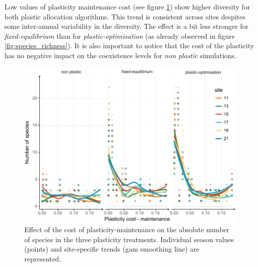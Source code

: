 

Low values of plasticity maintenance cost (see figure \ref{fig:pl_cost}) show higher diversity for both plastic allocation algorithms. This trend is consistent across sites despites some inter-annual variability in the diversity. The effect is a bit less stronger for \textit{fixed-equilibrium} than for \textit{plastic-optimisation} (as already observed in figure \ref{fig:species_richness}). It is also important to notice that the cost of the plasticity has no negative impact on the coexistence levels for \textit{non plastic} simulations.

\begin{figure}%
    \includegraphics[width=1\linewidth]{./2_PP/Figures/Comm/comm_n_sp_pc_m_edit.pdf}%
  \caption[Maintenance plasticity cost effect on species richness]{Effect of the cost of plasticity-maintenance on the absolute number of species in the three plasticity treatments. Individual season values (points) and site-specific trends (gam smoothing line) are represented. }
  \label{fig:pl_cost}
\end{figure}



